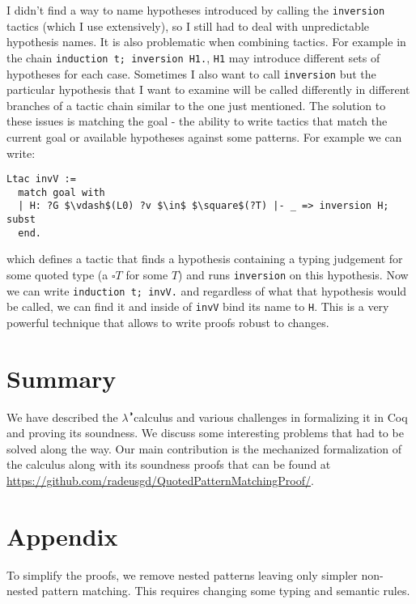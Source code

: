 \documentclass[runningheads]{article}
\newcommand{\calculus}{$\lambda^{\RIGHTcircle}$}
\begin{document}
I didn't find a way to name hypotheses introduced by calling the \verb|inversion| tactics (which I use extensively), so I still had to deal with unpredictable hypothesis names. It is also problematic when combining tactics. For example in the chain \verb|induction t; inversion H1.|, \verb|H1| may introduce different sets of hypotheses for each case. Sometimes I also want to call \verb|inversion| but the particular hypothesis that I want to examine will be called differently in different branches of a tactic chain similar to the one just mentioned. The solution to these issues is matching the goal - the ability to write tactics that match the current goal or available hypotheses against some patterns. For example we can write:
\begin{lstlisting}[mathescape=true]
Ltac invV :=
  match goal with
  | H: ?G $\vdash$(L0) ?v $\in$ $\square$(?T) |- _ => inversion H; subst
  end.
\end{lstlisting}
which defines a tactic that finds a hypothesis containing a typing judgement for some quoted type (a $\square T$ for some $T$) and runs \verb|inversion| on this hypothesis. Now we can write \verb|induction t; invV.| and regardless of what that hypothesis would be called, we can find it and inside of \verb|invV| bind its name to \verb|H|. This is a very powerful technique that allows to write proofs robust to changes.


\section{Summary}
\label{sec:summary}

We have described the \calculus calculus and various challenges in formalizing it in Coq and proving its soundness. We discuss some interesting problems that had to be solved along the way. Our main contribution is the mechanized formalization of the calculus along with its soundness proofs that can be found at \href{https://github.com/radeusgd/QuotedPatternMatchingProof/}{https://github.com/radeusgd/QuotedPatternMatchingProof/}.




\section*{Appendix}



To simplify the proofs, we remove nested patterns leaving only simpler non-nested pattern matching. This requires changing some typing and semantic rules.
\end{document}
